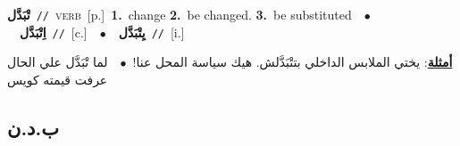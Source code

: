 \documentclass[10pt,a4paper,twoside]{article} %
\begin{document}
\begin{multicols}{2}
{\setlength\topsep{0pt}\textbf{\foreignlanguage{arabic}{تْبَدَّل}}\ {\color{gray}\texttt{//}\color{black}}\ \textsc{verb}\ [p.]\ \textbf{1.}~change  \textbf{2.}~be changed.  \textbf{3.}~be substituted\ \ $\bullet$\ \ \setlength\topsep{0pt}\textbf{\foreignlanguage{arabic}{اِتْبَدَّل}}\ {\color{gray}\texttt{//}\color{black}}\ [c.]\ \ $\bullet$\ \ \setlength\topsep{0pt}\textbf{\foreignlanguage{arabic}{يِتْبَدَّل}}\ {\color{gray}\texttt{//}\color{black}}\ [i.]\  \begin{flushright}\color{gray}\foreignlanguage{arabic}{\textbf{\underline{\foreignlanguage{arabic}{أمثلة}}}: يختي الملابس الداخلي بتتْبَدَّلش. هيك سياسة المحل عنا!\ $\bullet$\ \  لما تْبَدَّل علي الحال عرفت قيمته كويس}\end{flushright}\color{black}} \vspace{2mm}

\vspace{-3mm}
\subsection*{\color{blue}\foreignlanguage{arabic}{ب.د.ن}\color{blue}{}} 


\end{multicols}
\end{document}
